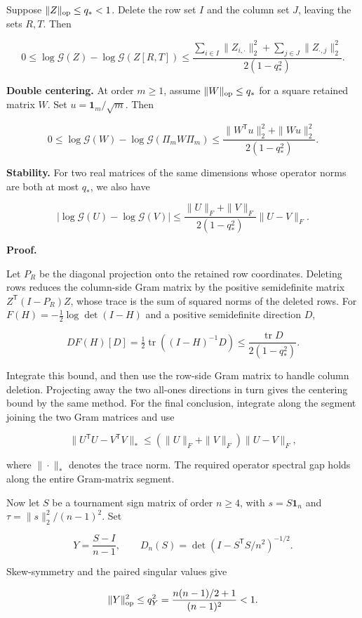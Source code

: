 \documentclass[11pt,a4paper]{article}
\begin{document}
Suppose \(\|Z\|_{\rm op}\le q_*<1\). Delete the row set \(I\) and the column set \(J\), leaving the sets \(R,T\). Then

\[
0\le\log\mathcal G(Z)-\log\mathcal G(Z[R,T])\le\frac{\sum_{i\in I}\|Z_{i,\cdot}\|_2^2+\sum_{j\in J}\|Z_{\cdot,j}\|_2^2}{2(1-q_*^2)}.
\]

\textbf{Double centering.} At order \(m\ge1\), assume \(\|W\|_{\rm op}\le q_*\) for a square retained matrix \(W\). Set \(u=\mathbf 1_m/\sqrt m\). Then

\[
0\le\log\mathcal G(W)-\log\mathcal G(\Pi_mW\Pi_m)\le\frac{\|W^{\mathsf T}u\|_2^2+\|Wu\|_2^2}{2(1-q_*^2)}.
\]

\textbf{Stability.} For two real matrices of the same dimensions whose operator norms are both at most \(q_*\), we also have

\[
|\log\mathcal G(U)-\log\mathcal G(V)|\le\frac{\|U\|_F+\|V\|_F}{2(1-q_*^2)}\|U-V\|_F.
\]

\textbf{Proof.}

Let \(P_R\) be the diagonal projection onto the retained row coordinates. Deleting rows reduces the column-side Gram matrix by the positive semidefinite matrix \(Z^{\mathsf T}(I-P_R)Z\), whose trace is the sum of squared norms of the deleted rows. For \(F(H)=-\tfrac12\log\det(I-H)\) and a positive semidefinite direction \(D\),

\[
DF(H)[D]=\tfrac12\operatorname{tr}((I-H)^{-1}D)\le\frac{\operatorname{tr}D}{2(1-q_*^2)}.
\]

Integrate this bound, and then use the row-side Gram matrix to handle column deletion. Projecting away the two all-ones directions in turn gives the centering bound by the same method. For the final conclusion, integrate along the segment joining the two Gram matrices and use

\[
\|U^{\mathsf T}U-V^{\mathsf T}V\|_*\le(\|U\|_F+\|V\|_F)\|U-V\|_F,
\]

where \(\|\cdot\|_*\) denotes the trace norm. The required operator spectral gap holds along the entire Gram-matrix segment.

Now let \(S\) be a tournament sign matrix of order \(n\ge4\), with \(s=S\mathbf 1_n\) and \(\tau=\|s\|_2^2/(n-1)^2\). Set

\[
Y=\frac{S-I}{n-1},\qquad D_n(S)=\det(I-S^{\mathsf T}S/n^2)^{-1/2}.
\]

Skew-symmetry and the paired singular values give

\[
\|Y\|_{\rm op}^2\le q_Y^2=\frac{n(n-1)/2+1}{(n-1)^2}<1.
\]
\end{document}
